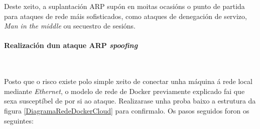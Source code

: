 Deste xeito, a suplantación \gls{ARP} supón en moitas ocasións o punto de partida para ataques de rede máis sofisticados, como ataques de denegación de servizo, \textit{Man in the middle} ou secuestro de sesións.\\

\paragraph{Realización dun ataque \gls{ARP} \textit{spoofing}}~~

Posto que o risco existe polo simple xeito de conectar unha máquina á rede local mediante \textit{Ethernet}, o modelo de rede de Docker previamente explicado fai que sexa susceptíbel de por si ao ataque. Realizarase unha proba baixo a estrutura da figura \ref{DiagramaRedeDockerCloud} para confirmalo. Os pasos seguidos foron os seguintes:

